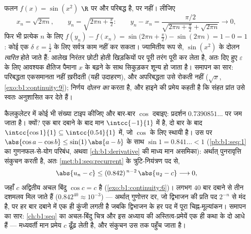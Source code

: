 \begin{example}[परिबद्ध, संतत, फिर भी एकसमान नहीं]\label{ex:b1:continuity:sinx2}
फलन $f(x) = \sin(x^2)$ $\R$ पर  और परिबद्ध है, पर 
नहीं। लीजिए
\[
x_n = \sqrt{2\pi n}, \qquad y_n = \sqrt{2\pi n + \tfrac\pi2}:
\qquad
y_n - x_n = \frac{\pi/2}{\sqrt{2\pi n + \frac\pi2} +
\sqrt{2\pi n}} \longrightarrow 0 ,
\]
फिर भी प्रत्येक $n$ के लिए $f(y_n) - f(x_n) = \sin\bigl(2\pi n +
\frac\pi2\bigr) - \sin(2\pi n) = 1 - 0 = 1$: कोई एक $\delta$ $\varepsilon =
\frac12$ के लिए सर्वत्र काम नहीं कर सकता। ज्यामितीय रूप से, $\sin(x^2)$ के
दोलन \emph{त्वरित} होते जाते हैं: आलेख निरंतर छोटी होती खिड़कियों पर पूरी
तरंग पूरी कर लेता है, अतः दिए हुए $\varepsilon$ के लिए आवश्यक क्षैतिज पैमाना
$x$ के बढ़ने के साथ सिकुड़कर शून्य हो जाता है। समापन का सार: परिबद्धता
एकसमानता नहीं ख़रीदती (यही उदाहरण), और अपरिबद्धता उसे रोकती नहीं ($\sqrt x$,
\cref{exo:b1:continuity:9}); निर्णय \emph{दोलन का } करता है, और हाइने
की प्रमेय कहती है कि संहत प्रांत उसे स्वतः अनुशासित कर देते हैं।
\end{example}

\begin{example}[कैलकुलेटर का प्रयोग, समझाया हुआ]\label{ex:b1:continuity:cositeration}
कैलकुलेटर में कोई भी संख्या टाइप कीजिए और बार-बार $\cos$ दबाइए: प्रदर्शन
$0.7390851\dots$ पर जम जाता है। क्यों? एक बार दबाने के बाद मान
$\intcc{-1}{1}$ में है, दो बार के बाद $\intcc{\cos 1}{1} \subseteq
\intcc{0.54}{1}$ में, जो $\cos$ के लिए स्थायी  है। उस पर $\abs{\cos a
- \cos b} \leq \sin(1)\,\abs{a - b}$ के साथ $\sin 1 = 0.841\dots < 1$
(\cref{pb:b1:seq:1} का गुणनफल-से-योग परिबंध, अथवा \cref{ch:b1:derivative} की
माध्य मान असमिका): अर्थात् पुनरावृत्ति संकुचन करती है, अतः
\cref{met:b1:seq:recurrent} के त्रुटि-नियंत्रण पद से,
\[
\abs{u_n - c} \leq (0.842)^{\,n-2}\,\abs{u_2 - c}
\longrightarrow 0 ,
\]
जहाँ $c$ अद्वितीय अचल बिंदु $\cos c = c$ है (\cref{exo:b1:continuity:6})।
लगभग $40$ बार दबाने से तीन दशमलव मिल जाते हैं ($0.842^{40} \approx 10^{-3}$)
--- अर्थात् गुणोत्तर दर, जो द्विभाजन की प्रति पद $2^{-n}$ से मंद है, पर हर
बार दबाने में एक ही कुंजी लगती है जबकि द्विभाजन के हर पद में पूरा
चिह्न-मूल्यांकन। समापन का सार: \cref{ch:b1:seq} का अचल-बिंदु चित्र और इस
अध्याय की अस्तित्व-प्रमेयें एक ही कथा के दो आधे हैं --- मध्यवर्ती मान प्रमेय
$c$ ढूँढ़ लेती है, और संकुचन उस तक पहुँच जाता है।
\end{example}

